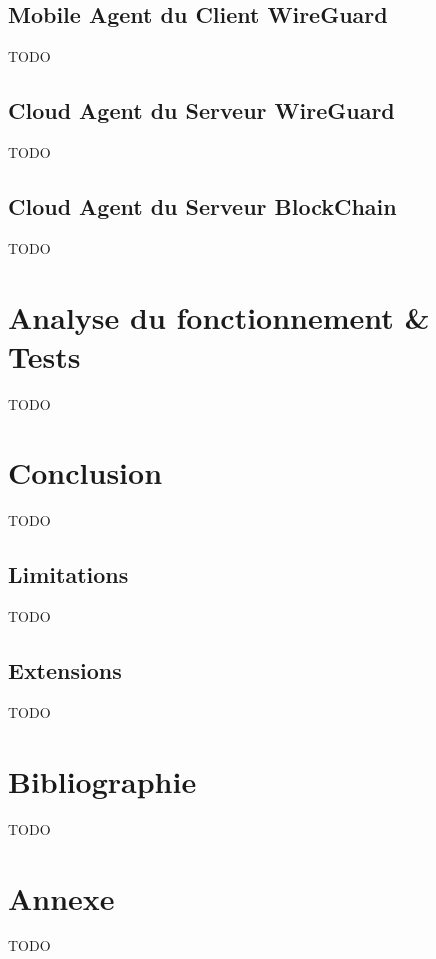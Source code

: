 \documentclass[12pt, openany]{report}
\begin{document}
\subsection{Mobile Agent du Client WireGuard}
\noindent 
\begin{flushleft}
TODO
\end{flushleft}

\subsection{Cloud Agent du Serveur WireGuard}
\noindent 
\begin{flushleft}
TODO
\end{flushleft}

\subsection{Cloud Agent du Serveur BlockChain}
\noindent 
\begin{flushleft}
TODO
\end{flushleft}

\section{Analyse du fonctionnement \& Tests}
\noindent 
\begin{flushleft}
TODO
\end{flushleft}

\section{Conclusion}
\noindent 
\begin{flushleft}
TODO
\end{flushleft}
\subsection{Limitations}
\noindent 
\begin{flushleft}
TODO
\end{flushleft}
\subsection{Extensions}
\noindent 
\begin{flushleft}
TODO
\end{flushleft}

\section{Bibliographie}
\noindent 
\begin{flushleft}
TODO
\end{flushleft}

\section{Annexe}
\noindent 
\begin{flushleft}
TODO
\end{flushleft}
\end{document}
